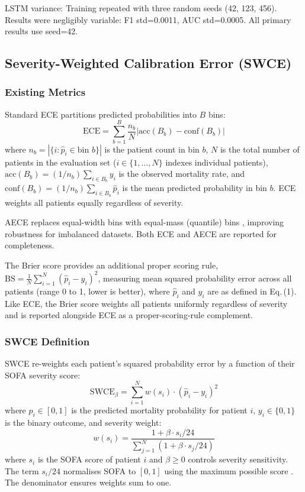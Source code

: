 \documentclass{ieeeaccess}
\begin{document}
LSTM variance: Training repeated with three random seeds (42, 123, 456). Results were negligibly variable: F1 std=0.0011, AUC std=0.0005. All primary results use seed=42.

\subsection{Severity-Weighted Calibration Error (SWCE)}
\label{sec:swce}

\subsubsection{Existing Metrics}

Standard ECE partitions predicted probabilities into $B$ bins:
\begin{equation}
\text{ECE} = \sum_{b=1}^{B} \frac{n_b}{N} \left| \text{acc}(B_b) - \text{conf}(B_b) \right|
\label{eq:ece}
\end{equation}
where $n_b = |\{i : \hat{p}_i \in \text{bin } b\}|$ is the patient count in bin $b$, $N$ is the total number of patients in the evaluation set ($i \in \{1,\ldots,N\}$ indexes individual patients), $\text{acc}(B_b) = (1/n_b)\sum_{i \in B_b} y_i$ is the observed mortality rate, and $\text{conf}(B_b) = (1/n_b)\sum_{i \in B_b} \hat{p}_i$ is the mean predicted probability in bin $b$. ECE weights all patients equally regardless of severity.

AECE replaces equal-width bins with equal-mass (quantile) bins \cite{b10}, improving robustness for imbalanced datasets. Both ECE and AECE are reported for completeness.

The Brier score provides an additional proper scoring rule, $\text{BS} = \frac{1}{N}\sum_{i=1}^{N}(\hat{p}_i - y_i)^2$, measuring mean squared probability error across all patients (range 0 to 1, lower is better), where $\hat{p}_i$ and $y_i$ are as defined in Eq.\,(1). Like ECE, the Brier score weights all patients uniformly regardless of severity and is reported alongside ECE as a proper-scoring-rule complement.

\subsubsection{SWCE Definition}

SWCE re-weights each patient's squared probability error by a function of their SOFA severity score:
\begin{equation}
\text{SWCE}_\beta = \sum_{i=1}^{N} w(s_i) \cdot (\hat{p}_i - y_i)^2
\label{eq:swce}
\end{equation}
where $\hat{p}_i \in [0,1]$ is the predicted mortality probability for patient $i$, $y_i \in \{0,1\}$ is the binary outcome, and severity weight:
\begin{equation}
w(s_i) = \frac{1 + \beta \cdot s_i / 24}{\sum_{j=1}^{N} (1 + \beta \cdot s_j / 24)}
\label{eq:weight}
\end{equation}
where $s_i$ is the SOFA score of patient $i$ and $\beta \ge 0$ controls severity sensitivity. The term $s_i/24$ normalises SOFA to $[0,1]$ using the maximum possible score \cite{b20}. The denominator ensures weights sum to one.
\end{document}
